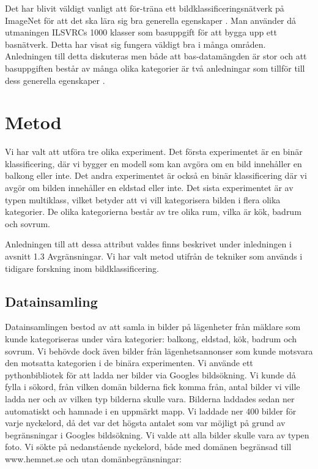 \documentclass[]{kththesis}
\begin{document}
Det har blivit väldigt vanligt att för-träna ett bildklassificeringsnätverk på ImageNet för att det ska lära sig bra generella egenskaper \parencite{huh2016makes}. Man använder då utmaningen ILSVRCs 1000 klasser som basuppgift för att bygga upp ett basnätverk. Detta har visat sig fungera väldigt bra i många områden. Anledningen till detta diskuteras men både att bas-datamängden är stor och att basuppgiften består av många olika kategorier är två anledningar som tillför till dess generella egenskaper \parencite{huh2016makes}.

\chapter{Metod}
Vi har valt att utföra tre olika experiment. Det första experimentet är en binär klassificering, där vi bygger en modell som kan avgöra om en bild innehåller en balkong eller inte. Det andra experimentet är också en binär klassificering där vi avgör om bilden innehåller en eldstad eller inte. Det sista experimentet är av typen multiklass, vilket betyder att vi vill kategorisera bilden i flera olika kategorier. De olika kategorierna består av tre olika rum, vilka är kök, badrum och sovrum.

Anledningen till att dessa attribut valdes finns beskrivet under inledningen i avsnitt 1.3 Avgränsningar. Vi har valt metod utifrån de tekniker som används i tidigare forskning inom bildklassificering.

\section{Datainsamling}
Datainsamlingen bestod av att samla in bilder på lägenheter från mäklare som kunde kategoriseras under våra kategorier: balkong, eldstad, kök, badrum och sovrum. Vi behövde dock även bilder från lägenhetsannonser som kunde motsvara den motsatta kategorien i de binära experimenten. Vi använde ett pythonbibliotek \parencite{google_image} för att ladda ner bilder via Googles bildsökning. Vi kunde då fylla i sökord, från vilken domän bilderna fick komma från, antal bilder vi ville ladda ner och av vilken typ bilderna skulle vara. Bilderna laddades sedan ner automatiskt och hamnade i en uppmärkt mapp. Vi laddade ner 400 bilder för varje nyckelord, då det var det högsta antalet som var möjligt på grund av begränsningar i Googles bildsökning. Vi valde att alla bilder skulle vara av typen foto. Vi sökte på nedanstående nyckelord, både med domänen begränsad till www.hemnet.se och utan domänbegränsningar:
\end{document}
